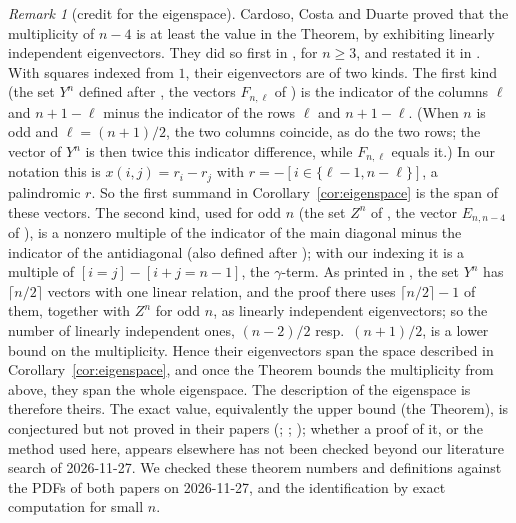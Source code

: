\documentclass[11pt]{amsart}
\theoremstyle{plain}
\theoremstyle{definition}
\theoremstyle{remark}
\newtheorem{remark}{Remark}
\numberwithin{equation}{section}
\newcommand{\iv}[1]{[#1]}              %
\begin{document}
\begin{remark}[credit for the eigenspace]\label{rem:credit}
Cardoso, Costa and Duarte proved that the multiplicity of \(n-4\) is at least the value
in the Theorem, by exhibiting linearly independent eigenvectors. They did so first in
\cite[Theorem~3.10]{CCD20}, for \(n\ge3\), and restated it in
\cite[Theorem~4.1 and Corollary~4.2]{CCD23}. With squares indexed from \(1\), their
eigenvectors are of two kinds. The first kind (the set \(Y^n\) defined after
\cite[Definition~3.9]{CCD20}, the vectors \(F_{n,\ell}\) of \cite{CCD23}) is the
indicator of the columns \(\ell\) and \(n+1-\ell\) minus the indicator of the rows
\(\ell\) and \(n+1-\ell\). (When \(n\) is odd and \(\ell=(n+1)/2\), the two columns
coincide, as do the two rows; the vector of \(Y^n\) is then twice this indicator
difference, while \(F_{n,\ell}\) equals it.) In our notation
this is \(x(i,j)=r_i-r_j\) with \(r=-\iv{i\in\{\ell-1,n-\ell\}}\), a palindromic \(r\).
So the first summand in Corollary~\ref{cor:eigenspace} is the span of these vectors. The
second kind, used for odd \(n\) (the set \(Z^n\) of \cite{CCD20}, the vector
\(E_{n,n-4}\) of \cite{CCD23}), is a nonzero multiple of the indicator of the main
diagonal minus the indicator of the antidiagonal (also defined after
\cite[Definition~3.9]{CCD20}); with our indexing it is a multiple of
\(\iv{i=j}-\iv{i+j=n-1}\), the \(\gamma\)-term. As printed in \cite{CCD20}, the set \(Y^n\) has
\(\lceil n/2\rceil\) vectors with one linear relation, and the proof there uses
\(\lceil n/2\rceil-1\) of them, together with \(Z^n\) for odd \(n\), as linearly independent
eigenvectors; so the number of linearly independent ones, \((n-2)/2\) resp.\ \((n+1)/2\), is a
lower bound on the multiplicity. Hence their eigenvectors span the space
described in Corollary~\ref{cor:eigenspace}, and once the Theorem bounds the
multiplicity from above, they span the whole eigenspace. The description of the
eigenspace is therefore theirs.
The exact value, equivalently the upper bound (the Theorem), is conjectured but not proved in their papers (\cite[Conjecture~3]{CCD20}; \cite[Conjecture~1]{CCD23}; \cite[Conjecture~4.1]{CCD25}); whether a proof of it,
or the method used here, appears elsewhere has not been checked beyond our literature search of 2026-11-27.
We checked these theorem numbers and definitions against the PDFs of both papers on
2026-11-27, and the identification by exact computation for small \(n\).
\end{remark}

\end{document}
